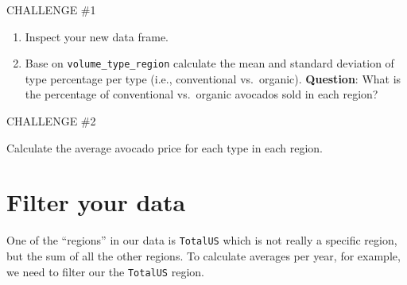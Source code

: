 \documentclass[]{book}
\newenvironment{Shaded}{\begin{snugshade}}{\end{snugshade}}
\newcommand{\DataTypeTok}[1]{\textcolor[rgb]{0.13,0.29,0.53}{#1}}
\newcommand{\KeywordTok}[1]{\textcolor[rgb]{0.13,0.29,0.53}{\textbf{#1}}}
\newcommand{\NormalTok}[1]{#1}
\newcommand{\OperatorTok}[1]{\textcolor[rgb]{0.81,0.36,0.00}{\textbf{#1}}}
\newcommand{\StringTok}[1]{\textcolor[rgb]{0.31,0.60,0.02}{#1}}
\begin{document}
\begin{Shaded}
\end{Shaded}

\leavevmode\hypertarget{challenge}{}%
CHALLENGE \#1

\begin{enumerate}
\def\labelenumi{\arabic{enumi}.}
\item
  Inspect your new data frame.
\item
  Base on \texttt{volume\_type\_region} calculate the mean and standard deviation of type percentage per type (i.e., conventional vs.~organic). \textbf{Question}: What is the percentage of conventional vs.~organic avocados sold in each region?
\end{enumerate}

\leavevmode\hypertarget{challenge}{}%
CHALLENGE \#2

Calculate the average avocado price for each type in each region.

\hypertarget{filter-your-data}{%
\section{Filter your data}\label{filter-your-data}}

One of the ``regions'' in our data is \texttt{TotalUS} which is not really a specific region, but the sum of all the other regions. To calculate averages per year, for example, we need to filter our the \texttt{TotalUS} region.

\begin{Shaded}
\end{Shaded}
\end{document}
